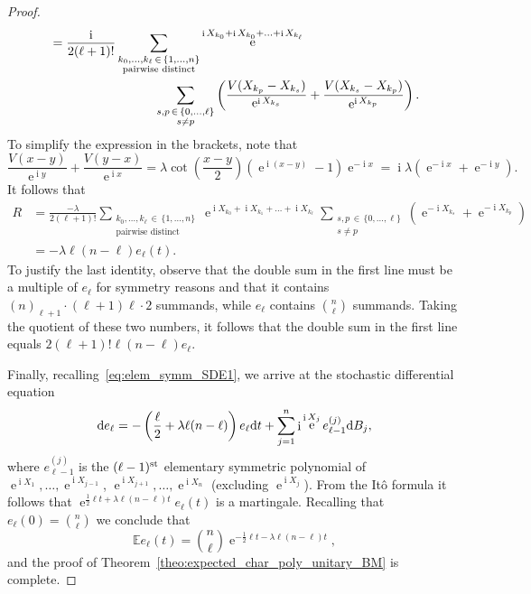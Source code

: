 \documentclass[AHL,Unicode,longabstracts,published]{cedram}
\DeclareMathOperator{\eee}{e}
\DeclareMathOperator{\ii}{i}
\newcommand{\E}{\mathbb{E}}
\newcommand*\dint{\text{\normalfont d}}
\begin{document}
\begin{proof}
\begin{align*}
&=
\frac{\ii}{2 (\ell+1)!}\sum_{\substack{k_0,\ldots, k_\ell\,\in\,\{1,\ldots, n\}\\\text{pairwise distinct}}}\eee^{\ii X_{k_0} + \ii X_{k_0} + \ldots + \ii X_{k_\ell}} \\
&\mkern150mu\sum_{\substack{s,p\,\in\,\{0,\ldots,\ell\}\\s\neq p}} \left(\frac{V(X_{k_p} - X_{k_s})}{\eee^{\ii X_{k_s}}} + \frac{V(X_{k_s} - X_{k_p})}{\eee^{\ii X_{k_p}}}\right).
\end{align*}
To simplify the expression in the brackets, note that
\[
\frac{V(x - y)}{\eee^{\ii y}} + \frac{V(y - x)}{\eee^{\ii x}} =
\lambda \cot \left(\frac {x-y}{2}\right) \left(\eee^{\ii (x-y)} - 1\right) \eee^{-\ii x} =
\ii \lambda \left(\eee^{- \ii x} + \eee^{- \ii y}\right).
\]
It follows that
\begin{align*}
R &=
\frac{-\lambda}{2 (\ell+1)!}\sum_{\substack{k_0,\ldots, k_\ell\,\in\,\{1,\ldots, n\}\\
\text{pairwise distinct}}}\eee^{\ii X_{k_0} + \ii X_{k_1} + \ldots + \ii X_{k_\ell}} \sum_{\substack{s,p\,\in\,\{0,\ldots,\ell\}\\
s\neq p}} \left(\eee^{ - \ii X_{k_s}} + \eee^{-\ii X_{k_p}}\right)\\
&= - \lambda \ell (n-\ell) e_\ell(t).
\end{align*}
To justify the last identity, observe that the double sum in the first line must be a multiple of $e_\ell$ for symmetry reasons and that it contains $(n)_{\ell+1} \cdot (\ell+1) \ell \cdot 2$ summands, while $e_\ell$ contains $\binom n \ell$ summands. Taking the quotient of these two numbers, it follows that the double sum in the first line equals $2(\ell+1)! \ell(n-\ell) e_{\ell}$.

Finally, recalling~\eqref{eq:elem_symm_SDE1}, we arrive at the stochastic differential equation
\begin{equation}\label{eq:elem_symm_SDE2}
\dint e_\ell = - \left(\frac \ell 2 + \lambda \ell (n-\ell)\right) e_\ell \dint t + \sum_{j=1}^n \ii \eee^{\ii X_j} e_{\ell-1}^{(j)} \dint B_j,
\end{equation}
where $e_{\ell-1}^{(j)}$ is the $(\ell-1)^{\text{\normalfont st}}$ elementary symmetric polynomial of $\eee^{\ii X_1},\ldots,\eee^{\ii X_{j-1}}$, $\eee^{\ii X_{j+1}}, \ldots, \eee^{\ii X_{n}}$ (excluding $\eee^{\ii X_{j}}$). From the Itô formula it follows that $\eee^{\frac 1 2 \ell t + \lambda \ell (n-\ell) t} e_\ell(t)$ is a martingale. Recalling that $e_\ell(0) = \binom n \ell$ we conclude that
\[
\E e_\ell (t) = \binom n\ell \eee^{-\frac 1 2 \ell t - \lambda \ell (n-\ell) t},
\]
and the proof of Theorem~\ref{theo:expected_char_poly_unitary_BM} is complete.
\end{proof}
\end{document}
